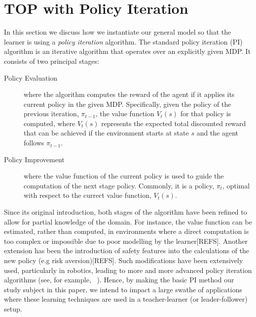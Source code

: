 
\section{TOP with Policy Iteration}\label{sec: TOP-PI}

In this section we discuss how we instantiate our general model so that the learner is using a \emph{policy iteration} algorithm.
The standard policy iteration (PI) algorithm is an iterative algorithm
that operates over an explicitly given MDP\cite{puterman_book_94}.  It consists of two principal stages:
\begin{description}
\item[Policy Evaluation] where the algorithm computes the reward of the agent if it applies its current policy in the given MDP. Specifically,
given the policy of the previous iteration, $\pi_{t-1}$, the value
function $V_t(s)$ for that policy is computed, where $V_t(s)$
represents the expected total discounted reward that can be achieved
if the environment starts at state $s$ and the agent follows
$\pi_{t-1}$.

\item[Policy Improvement]  where the value function
of the current policy is used to guide the computation of the next
stage policy. Commonly, it is a policy, $\pi_{t}$, optimal with
respect to the currect value function, $V_t(s)$.
\end{description}


Since its original introduction, both stages of the algorithm have
been refined to allow for partial knowledge of the domain.
 For instance, the value function can be
estimated, rather than computed, in environments where a direct
computation is too complex or impossible due to poor modelling by the
learner[REFS]. Another  extension has been the  introduction of safety features
into the calculations of the new policy (e.g risk aversion)[REFS]. Such
modifications have been extensively used, particularly in robotics,
leading to more and more advanced policy iteration algorithms (see, for example, ~\cite{sugiyama_et_al_2009}). Hence, by making the basic PI method our
study subject in this paper, we intend to impact a large swathe of
applications where these learning techniques are used in a
teacher-learner (or leader-follower) setup.


